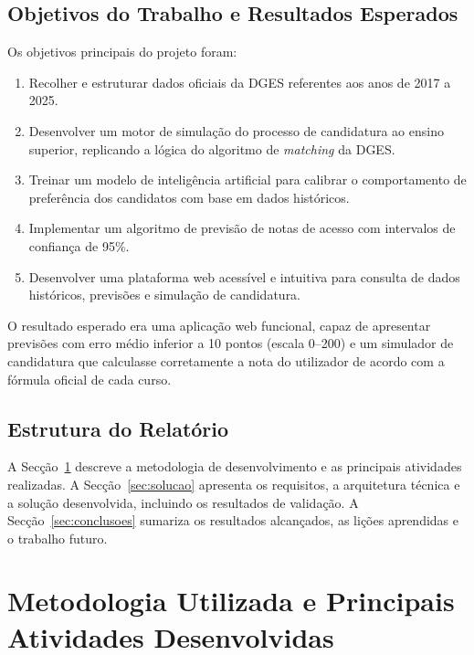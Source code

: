 \documentclass[12pt,a4paper]{article}
\begin{document}
\subsection{Objetivos do Trabalho e Resultados Esperados}

Os objetivos principais do projeto foram:
\begin{enumerate}[noitemsep]
  \item Recolher e estruturar dados oficiais da DGES referentes aos anos de 2017 a 2025.
  \item Desenvolver um motor de simulação do processo de candidatura ao ensino superior, replicando a lógica do algoritmo de \textit{matching} da DGES.
  \item Treinar um modelo de inteligência artificial para calibrar o comportamento de preferência dos candidatos com base em dados históricos.
  \item Implementar um algoritmo de previsão de notas de acesso com intervalos de confiança de 95\%.
  \item Desenvolver uma plataforma web acessível e intuitiva para consulta de dados históricos, previsões e simulação de candidatura.
\end{enumerate}

O resultado esperado era uma aplicação web funcional, capaz de apresentar previsões com erro médio inferior a 10 pontos (escala 0--200) e um simulador de candidatura que calculasse corretamente a nota do utilizador de acordo com a fórmula oficial de cada curso.

\subsection{Estrutura do Relatório}

A Secção~\ref{sec:metodologia} descreve a metodologia de desenvolvimento e as principais atividades realizadas. A Secção~\ref{sec:solucao} apresenta os requisitos, a arquitetura técnica e a solução desenvolvida, incluindo os resultados de validação. A Secção~\ref{sec:conclusoes} sumariza os resultados alcançados, as lições aprendidas e o trabalho futuro.

\section{Metodologia Utilizada e Principais Atividades Desenvolvidas}
\label{sec:metodologia}
\end{document}
